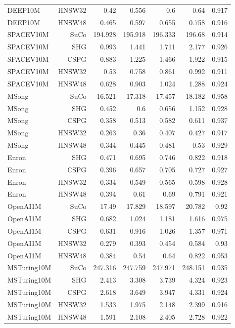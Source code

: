 \begin{table}[t]
\begin{tabular}{lrrrrrr}
DEEP10M & HNSW32 & 0.42 & 0.556 & 0.6 & 0.64 & 0.917 \\
DEEP10M & HNSW48 & 0.465 & 0.597 & 0.655 & 0.758 & 0.916 \\
SPACEV10M & SuCo & 194.928 & 195.918 & 196.333 & 196.68 & 0.914 \\
SPACEV10M & SHG & 0.993 & 1.441 & 1.711 & 2.177 & 0.926 \\
SPACEV10M & CSPG & 0.883 & 1.225 & 1.466 & 1.922 & 0.915 \\
SPACEV10M & HNSW32 & 0.53 & 0.758 & 0.861 & 0.992 & 0.911 \\
SPACEV10M & HNSW48 & 0.628 & 0.903 & 1.024 & 1.288 & 0.924 \\
MSong & SuCo & 16.521 & 17.318 & 17.457 & 18.182 & 0.958 \\
MSong & SHG & 0.452 & 0.6 & 0.656 & 1.152 & 0.928 \\
MSong & CSPG & 0.358 & 0.513 & 0.582 & 0.611 & 0.937 \\
MSong & HNSW32 & 0.263 & 0.36 & 0.407 & 0.427 & 0.917 \\
MSong & HNSW48 & 0.344 & 0.445 & 0.481 & 0.53 & 0.929 \\
Enron & SHG & 0.471 & 0.695 & 0.746 & 0.822 & 0.918 \\
Enron & CSPG & 0.396 & 0.657 & 0.705 & 0.727 & 0.927 \\
Enron & HNSW32 & 0.334 & 0.549 & 0.565 & 0.598 & 0.928 \\
Enron & HNSW48 & 0.394 & 0.61 & 0.69 & 0.791 & 0.921 \\
OpenAI1M & SuCo & 17.49 & 17.829 & 18.597 & 20.782 & 0.92 \\
OpenAI1M & SHG & 0.682 & 1.024 & 1.181 & 1.616 & 0.975 \\
OpenAI1M & CSPG & 0.631 & 0.916 & 1.026 & 1.357 & 0.971 \\
OpenAI1M & HNSW32 & 0.279 & 0.393 & 0.454 & 0.584 & 0.93 \\
OpenAI1M & HNSW48 & 0.384 & 0.54 & 0.64 & 0.822 & 0.953 \\
MSTuring10M & SuCo & 247.316 & 247.759 & 247.971 & 248.151 & 0.935 \\
MSTuring10M & SHG & 2.413 & 3.308 & 3.739 & 4.324 & 0.923 \\
MSTuring10M & CSPG & 2.618 & 3.649 & 3.947 & 4.331 & 0.924 \\
MSTuring10M & HNSW32 & 1.533 & 1.975 & 2.148 & 2.399 & 0.916 \\
MSTuring10M & HNSW48 & 1.591 & 2.108 & 2.405 & 2.728 & 0.922 \\
\bottomrule
\end{tabular}
\end{table}
